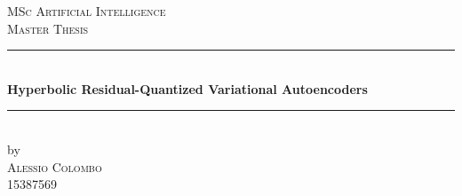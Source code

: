 \documentclass[12pt]{report}
\begin{document}
\begin{titlepage}



\newcommand{\HRule}{\rule{\linewidth}{0.5mm}} %

\center %

 





\textsc{\Large MSc Artificial Intelligence}\\[0.2cm]

\textsc{\Large Master Thesis}\\[0.5cm] 








\HRule \\[0.4cm]

{ \huge \bfseries Hyperbolic Residual-Quantized Variational Autoencoders}\\[0.4cm] %

\HRule \\[0.5cm]

 






by\\[0.2cm]

\textsc{\Large Alessio Colombo}\\[0.2cm] %

15387569\\[1cm]






\end{titlepage}
\end{document}

